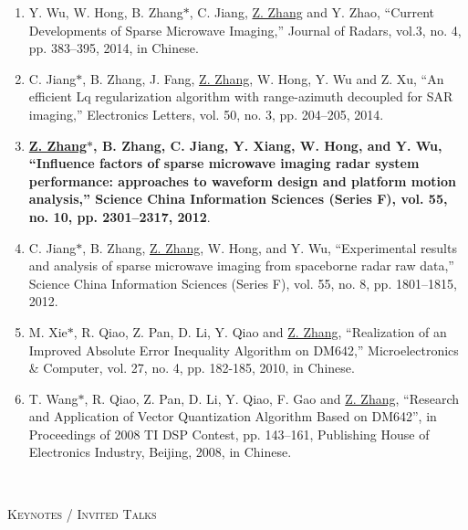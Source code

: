 \documentclass[paper=a4,fontsize=11pt]{scrartcl}
\begin{document}
\begin{enumerate}
\item Y. Wu, W. Hong, B. Zhang$\ast$, C. Jiang, \underline{Z. Zhang} and Y. Zhao, ``Current Developments of Sparse Microwave Imaging,'' Journal of Radars, vol.3, no. 4, pp. 383--395, 2014, in Chinese.

\item C. Jiang$\ast$, B. Zhang, J. Fang, \underline{Z. Zhang}, W. Hong, Y. Wu and Z. Xu, ``An efficient Lq regularization algorithm with range-azimuth decoupled for SAR imaging,'' Electronics Letters, vol. 50, no. 3, pp. 204--205, 2014.

\item \textbf{\underline{Z. Zhang$\ast$}, B. Zhang, C. Jiang, Y. Xiang, W. Hong, and Y. Wu, ``Influence factors of sparse microwave imaging radar system performance: approaches to waveform design and platform motion analysis,'' Science China Information Sciences (Series F), vol. 55, no. 10, pp. 2301--2317, 2012}.

\item C. Jiang$\ast$, B. Zhang, \underline{Z. Zhang}, W. Hong, and Y. Wu, ``Experimental results and analysis of sparse microwave imaging from spaceborne radar raw data,'' Science China Information Sciences (Series F), vol. 55, no. 8, pp. 1801--1815, 2012.


\item M. Xie$\ast$, R. Qiao, Z. Pan, D. Li, Y. Qiao and \underline{Z. Zhang}, ``Realization of an Improved Absolute Error Inequality Algorithm on DM642,'' Microelectronics \& Computer, vol. 27, no. 4, pp. 182-185, 2010, in Chinese.

\item T. Wang$\ast$, R. Qiao, Z. Pan, D. Li, Y. Qiao, F. Gao and \underline{Z. Zhang}, ``Research and Application of Vector Quantization Algorithm Based on DM642'', in Proceedings of 2008 TI DSP Contest, pp. 143--161, Publishing House of Electronics Industry, Beijing, 2008, in Chinese. 

~\\
	
\end{enumerate}

\textsc{Keynotes / Invited Talks}
\end{document}
